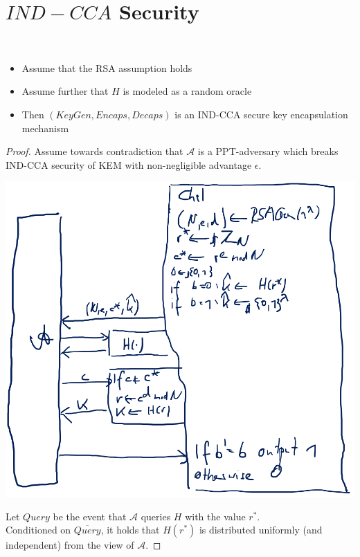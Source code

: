     \section{$IND-CCA$ Security}
        \begin{theorem}\label{thm8.3}\ 
            \begin{itemize}
                \item Assume that the RSA assumption holds
                \item Assume further that $H$ is modeled as a random oracle
                \item Then $(KeyGen,Encaps,Decaps)$ is an IND-CCA secure key encapsulation mechanism
            \end{itemize}
        \end{theorem}
        \begin{proof}
            Assume towards contradiction that $\mathcal{A}$ is a PPT-adversary which breaks IND-CCA security of KEM with non-negligible advantage $\epsilon$.
            \begin{center}
	            \includegraphics[width=160mm]{Graphics/IND-CCA secure Key Encapsulation from RSA/bla1.png}
            \end{center}
            Let $Query$ be the event that $\mathcal{A}$ queries $H$ with the value $r^*$.\\
            Conditioned on $\overline{Query}$, it holds that $H(r^*)$ is distributed uniformly (and independent) from the view of $\mathcal{A}$.

\end{proof}
